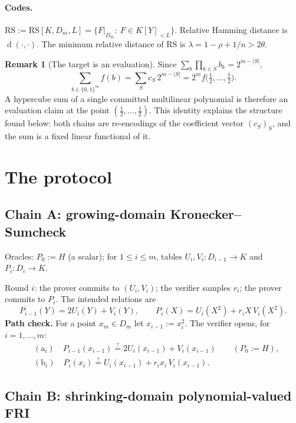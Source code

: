 \documentclass[11pt]{article}
\theoremstyle{definition}
\newtheorem{remark}[theorem]{Remark}
\newcommand{\K}{K}
\newcommand{\RS}{\mathrm{RS}}
\DeclareMathOperator{\dist}{d}
\begin{document}
\paragraph{Codes.} $\RS:=\RS[\K,D_m,L]=\{F|_{D_m}:\ F\in\K[Y]_{<L}\}$. Relative Hamming distance is $\dist(\cdot,\cdot)$. The minimum relative distance of $\RS$ is $\lambda=1-\rho+1/n>2\theta$.

\begin{remark}[The target is an evaluation]\label{rem:half}
Since $\sum_{b}\prod_{k\in S}b_k=2^{m-|S|}$,
\[
\sum_{b\in\{0,1\}^m}f(b)=\sum_S c_S\,2^{m-|S|}=2^m f\big(\tfrac12,\dots,\tfrac12\big).
\]
A hypercube sum of a single committed multilinear polynomial is therefore an evaluation claim at the point $(\frac12,\dots,\frac12)$. This identity explains the structure found below: both chains are re-encodings of the coefficient vector $(c_S)_S$, and the sum is a fixed linear functional of it.
\end{remark}

\section{The protocol}

\subsection{Chain A: growing-domain Kronecker--Sumcheck}

Oracles: $P_0:=H$ (a scalar); for $1\le i\le m$, tables $U_i,V_i:D_{i-1}\to\K$ and $P_i:D_i\to\K$.

Round $i$: the prover commits to $(U_i,V_i)$; the verifier samples $r_i$; the prover commits to $P_i$. The intended relations are
\[
P_{i-1}(Y)=2U_i(Y)+V_i(Y),\qquad P_i(X)=U_i(X^2)+r_iX\,V_i(X^2).
\]
\textbf{Path check.} For a point $x_m\in D_m$ let $x_{i-1}:=x_i^2$. The verifier opens, for $i=1,\dots,m$:
\begin{align*}
&(\mathrm a_i)\quad P_{i-1}(x_{i-1})\overset?=2U_i(x_{i-1})+V_i(x_{i-1})\qquad(P_0:=H),\\
&(\mathrm b_i)\quad P_i(x_i)\overset?=U_i(x_{i-1})+r_ix_i\,V_i(x_{i-1}).
\end{align*}

\subsection{Chain B: shrinking-domain polynomial-valued FRI}
\end{document}
